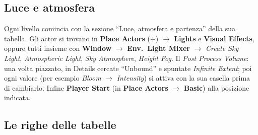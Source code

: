 \documentclass[a4paper,10pt]{article}
\newcommand{\nodo}[1]{\textsf{\textbf{#1}}}
\newcommand{\tasto}[1]{\fbox{\footnotesize\textsf{#1}}}
\begin{document}
\subsection{Luce e atmosfera}

Ogni livello comincia con la sezione ``Luce, atmosfera e partenza'' della sua tabella. Gli actor si trovano in \nodo{Place Actors} (\tasto{Shift}+\tasto{1}) $\rightarrow$ \nodo{Lights} e \nodo{Visual Effects}, oppure tutti insieme con \nodo{Window} $\rightarrow$ \nodo{Env.~Light Mixer} $\rightarrow$ \emph{Create Sky Light}, \emph{Atmospheric Light}, \emph{Sky Atmosphere}, \emph{Height Fog}. Il \emph{Post Process Volume}: una volta piazzato, in Details cercate ``Unbound'' e spuntate \emph{Infinite Extent}; poi ogni valore (per esempio \emph{Bloom} $\rightarrow$ \emph{Intensity}) si attiva con la sua casella prima di cambiarlo. Infine \nodo{Player Start} (in \nodo{Place Actors} $\rightarrow$ \nodo{Basic}) alla posizione indicata.

\subsection{Le righe delle tabelle}
\end{document}
